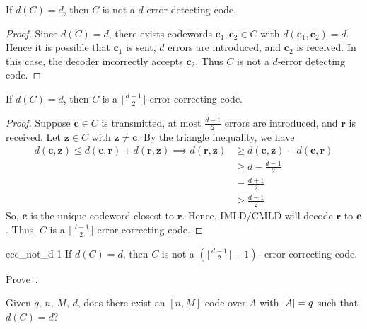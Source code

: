\begin{Theorem}{}{}
    If $ d(C)=d $, then $ C $ is not a $ d $-error detecting code.
\end{Theorem}

\begin{proof}
    Since $ d(C)=d $, there exists codewords $ \bm{c}_1,\bm{c}_2\in C $
    with $ d(\bm{c}_1,\bm{c}_2)=d $. Hence it is possible that
    $ \bm{c}_1 $ is sent, $ d $ errors are introduced, and $ \bm{c}_2 $
    is received. In this case, the decoder incorrectly accepts
    $ \bm{c}_2 $. Thus $ C $ is not a $ d $-error detecting code.
\end{proof}

\begin{Theorem}{}{}
    If $ d(C)=d $, then $ C $ is a $ \bigl\lfloor \frac{d-1}{2} \bigr\rfloor $-error
    correcting code.
\end{Theorem}

\begin{proof}
    Suppose $ \bm{c}\in C $ is transmitted, at most $ \frac{d-1}{2}  $ errors
    are introduced, and $ \bm{r} $ is received.
    Let $ \bm{z}\in C $ with $ \bm{z}\neq \bm{c} $.
    By the triangle inequality, we have
    \begin{align*}
        d(\bm{c},\bm{z})\leqslant d(\bm{c},\bm{r})+d(\bm{r},\bm{z})\implies
        d(\bm{r},\bm{z})
         & \geqslant d(\bm{c},\bm{z})-d(\bm{c},\bm{r}) \\
         & \geqslant d-\frac{d-1}{2}                   \\
         & =\frac{d+1}{2}                              \\
         & >\frac{d-1}{2}
    \end{align*}
    So, $ \bm{c} $ is the unique codeword closest to $ \bm{r} $. Hence, IMLD/CMLD
    will decode $ \bm{r} $ to $ \bm{c} $. Thus, $ C $ is a
    $ \bigl\lfloor \frac{d-1}{2} \bigr\rfloor $-error correcting code.
\end{proof}

\begin{Theorem}{}{ecc_not_d-1}
    If $ d(C)=d $, then $ C $ is not a $ \left( \bigr\lfloor \frac{d-1}{2}\bigl\rfloor +1 \right) $-
    error correcting code.
\end{Theorem}

\begin{Exercise}{}{}
    Prove~.
\end{Exercise}

Given $ q,\,n,\,M,\,d $, does there exist an $ [n,M] $-code over $ A $
with $ \lvert A\rvert=q $ such that $ d(C)=d $?

